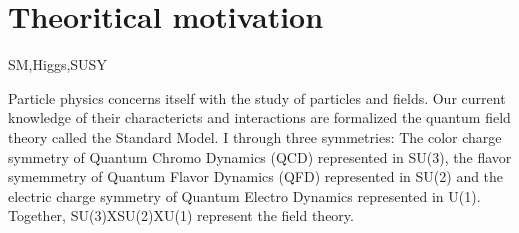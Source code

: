 \clearpage
\section{Theoritical motivation\label{sec:theory}}
SM,Higgs,SUSY

Particle physics concerns itself with the study of particles and fields. 
Our current knowledge of their charactericts and interactions are formalized
the quantum field theory called the Standard Model.  I 
through three symmetries: The color charge symmetry of Quantum Chromo 
Dynamics (QCD) represented in SU(3), the flavor symemmetry of Quantum 
Flavor Dynamics (QFD) represented in SU(2) and the electric charge symmetry of Quantum 
Electro Dynamics represented in U(1). Together, SU(3)XSU(2)XU(1) 
represent the field theory. 
